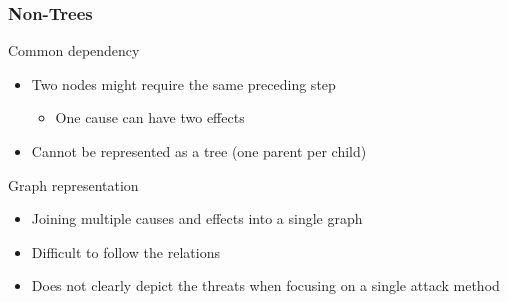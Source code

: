 

\begin{frame}\frametitle{Non-Trees}
  \begin{block}{Common dependency}
    \begin{itemize}
      \item Two nodes might require the same preceding step
      \begin{itemize}
        \item One cause can have two effects
      \end{itemize}
      \item Cannot be represented as a tree (one parent per child)
    \end{itemize}
  \end{block}
  \begin{block}{Graph representation}
    \begin{itemize}
      \item Joining multiple causes and effects into a single graph
      \item Difficult to follow the relations
      \item Does not clearly depict the threats when focusing on a single attack method
    \end{itemize}
  \end{block}
\end{frame}
